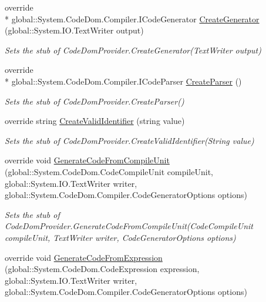 \begin{DoxyCompactItemize}
override \\*
global\-::\-System.\-Code\-Dom.\-Compiler.\-I\-Code\-Generator \hyperlink{class_system_1_1_code_dom_1_1_compiler_1_1_fakes_1_1_stub_code_dom_provider_aa691adaabc96b7807cde03281e5d9240}{Create\-Generator} (global\-::\-System.\-I\-O.\-Text\-Writer output)
\begin{DoxyCompactList}\small\item\em Sets the stub of Code\-Dom\-Provider.\-Create\-Generator(\-Text\-Writer output)\end{DoxyCompactList}\item 
override \\*
global\-::\-System.\-Code\-Dom.\-Compiler.\-I\-Code\-Parser \hyperlink{class_system_1_1_code_dom_1_1_compiler_1_1_fakes_1_1_stub_code_dom_provider_a1ffb8a37b33df18fafdc36efec5666bf}{Create\-Parser} ()
\begin{DoxyCompactList}\small\item\em Sets the stub of Code\-Dom\-Provider.\-Create\-Parser()\end{DoxyCompactList}\item 
override string \hyperlink{class_system_1_1_code_dom_1_1_compiler_1_1_fakes_1_1_stub_code_dom_provider_af87df03e494fae830a78cca9fe477396}{Create\-Valid\-Identifier} (string value)
\begin{DoxyCompactList}\small\item\em Sets the stub of Code\-Dom\-Provider.\-Create\-Valid\-Identifier(\-String value)\end{DoxyCompactList}\item 
override void \hyperlink{class_system_1_1_code_dom_1_1_compiler_1_1_fakes_1_1_stub_code_dom_provider_adde39a6d42cfb301c0f12d78bcd6c598}{Generate\-Code\-From\-Compile\-Unit} (global\-::\-System.\-Code\-Dom.\-Code\-Compile\-Unit compile\-Unit, global\-::\-System.\-I\-O.\-Text\-Writer writer, global\-::\-System.\-Code\-Dom.\-Compiler.\-Code\-Generator\-Options options)
\begin{DoxyCompactList}\small\item\em Sets the stub of Code\-Dom\-Provider.\-Generate\-Code\-From\-Compile\-Unit(\-Code\-Compile\-Unit compile\-Unit, Text\-Writer writer, Code\-Generator\-Options options)\end{DoxyCompactList}\item 
override void \hyperlink{class_system_1_1_code_dom_1_1_compiler_1_1_fakes_1_1_stub_code_dom_provider_a992b91bee4c472f7c04ea46ed829c38b}{Generate\-Code\-From\-Expression} (global\-::\-System.\-Code\-Dom.\-Code\-Expression expression, global\-::\-System.\-I\-O.\-Text\-Writer writer, global\-::\-System.\-Code\-Dom.\-Compiler.\-Code\-Generator\-Options options)

\end{DoxyCompactItemize}
